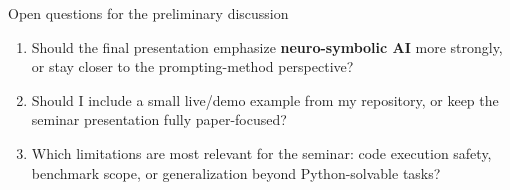 \begin{frame}{Open questions for the preliminary discussion}
\begin{enumerate}
  \item Should the final presentation emphasize \textbf{neuro-symbolic AI} more strongly, or stay closer to the prompting-method perspective?
  \item Should I include a small live/demo example from my repository, or keep the seminar presentation fully paper-focused?
  \item Which limitations are most relevant for the seminar: code execution safety, benchmark scope, or generalization beyond Python-solvable tasks?
\end{enumerate}
\end{frame}
